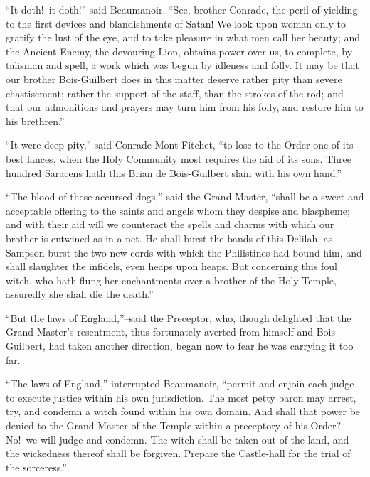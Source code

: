 ``It doth!--it doth!'' said Beaumanoir. ``See, brother Conrade, the
peril of yielding to the first devices and blandishments of Satan! We
look upon woman only to gratify the lust of the eye, and to take
pleasure in what men call her beauty; and the Ancient Enemy, the
devouring Lion, obtains power over us, to complete, by talisman and
spell, a work which was begun by idleness and folly. It may be that our
brother Bois-Guilbert does in this matter deserve rather pity than
severe chastisement; rather the support of the staff, than the strokes
of the rod; and that our admonitions and prayers may turn him from his
folly, and restore him to his brethren.''

``It were deep pity,'' said Conrade Mont-Fitchet, ``to lose to the Order
one of its best lances, when the Holy Community most requires the aid of
its sons. Three hundred Saracens hath this Brian de Bois-Guilbert slain
with his own hand.''

``The blood of these accursed dogs,'' said the Grand Master, ``shall be
a sweet and acceptable offering to the saints and angels whom they
despise and blaspheme; and with their aid will we counteract the spells
and charms with which our brother is entwined as in a net. He shall
burst the bands of this Delilah, as Sampson burst the two new cords with
which the Philistines had bound him, and shall slaughter the infidels,
even heaps upon heaps. But concerning this foul witch, who hath flung
her enchantments over a brother of the Holy Temple, assuredly she shall
die the death.''

``But the laws of England,''--said the Preceptor, who, though delighted
that the Grand Master's resentment, thus fortunately averted from
himself and Bois-Guilbert, had taken another direction, began now to
fear he was carrying it too far.

``The laws of England,'' interrupted Beaumanoir, ``permit and enjoin
each judge to execute justice within his own jurisdiction. The most
petty baron may arrest, try, and condemn a witch found within his own
domain. And shall that power be denied to the Grand Master of the Temple
within a preceptory of his Order?--No!--we will judge and condemn. The
witch shall be taken out of the land, and the wickedness thereof shall
be forgiven. Prepare the Castle-hall for the trial of the sorceress.''

